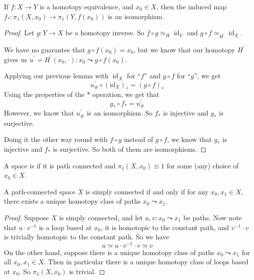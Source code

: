 \documentclass[a4paper, 10pt, twocolumn]{amsart}
\begin{document}
\begin{theorem}
  If $f: X \rightarrow Y$ is a homotopy equivalence, and $x_0 \in X$, then the induced map
  $f_*: \pi_1(X, x_0) \rightarrow \pi_1(Y, f(x_0))$ is an isomorphism.
\end{theorem}
\begin{proof}
  Let $g: Y \rightarrow X$ be a homotopy inverse. So $f \circ g \simeq_H \operatorname{id}_Y$ and $g \circ f \simeq_{H^{\prime}} \operatorname{id}_X$.

  We have no guarantee that $g \circ f\left(x_0\right)=x_0$, but we know that our homotopy $H^{\prime}$ gives us $u^{\prime}=H^{\prime}\left(x_0, \cdot\right): x_0 \leadsto g \circ f\left(x_0\right)$.

Applying our previous lemma with $\operatorname{id}_X$ for ``$f$'' and $g \circ f$ for ``$g$'', we get
$$
u_{\#}^{\prime} \circ\left(\mathrm{id}_X\right)_*=(g \circ f)_*
$$
Using the properties of the $*$ operation, we get that
$$
g_* \circ f_*=u_{\#}^{\prime}
$$
However, we know that $u_{\#}^{\prime}$ is an isomorphism. So $f_*$ is injective and $g_*$ is surjective.

Doing it the other way round with $f \circ g$ instead of $g \circ f$, we know that $g_*$ is injective and $f_*$ is surjective. So both of them are isomorphisms.
\end{proof}

\begin{definition}
  A space is  if it is path connected and $\pi_1(X, x_0) \equiv 1$ for some (any) choice of $x_0 \in X$.
\end{definition}

\begin{lemma}
  A path-connected space $X$ is simply connected if and only if for any $x_0, x_1 \in X$, there exists a unique homotopy class of paths $x_0 \leadsto x_1$.
\end{lemma}
\begin{proof}
Suppose $X$ is simply connected, and let $u, v: x_0 \leadsto x_1$ be paths. Now note that $u \cdot v^{-1}$ is a loop based at $x_0$, it is homotopic to the constant path, and $v^{-1} \cdot v$ is trivially homotopic to the constant path. So we have
$$
u \simeq u \cdot v^{-1} \cdot v \simeq v
$$
On the other hand, suppose there is a unique homotopy class of paths $x_0 \leadsto x_1$ for all $x_0, x_1 \in X$. Then in particular there is a unique homotopy class of loops based at $x_0$. So $\pi_1\left(X, x_0\right)$ is trivial.
\end{proof}

\end{document}
